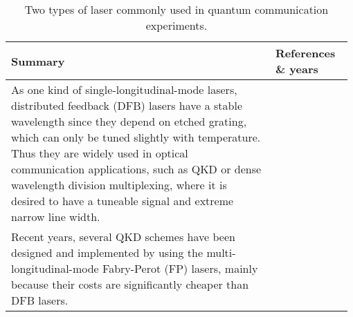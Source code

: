 \begin{table*}[!htbp]
	\begin{tabular}{|p{0.755\linewidth}|p{0.22\linewidth}|}
		\hline
		Summary & References \& years \\
		\hline \hline
		 As one kind of single-longitudinal-mode lasers, distributed feedback (DFB) lasers have a stable wavelength since they depend on etched grating, which can only be tuned slightly with temperature. Thus they are widely used in optical communication applications, such as QKD or dense wavelength division multiplexing, where it is desired to have a tuneable signal and extreme narrow line width. & \cite{bib:sun2016quantum, bib:liao2017long} \\
		\hline
		 Recent years, several QKD schemes have been designed and implemented by using the multi-longitudinal-mode Fabry-Perot (FP) lasers, mainly because their costs are significantly cheaper than DFB lasers. &  \cite{bib:choi2011quantum,  bib:wang2015experimental} \\
        \hline
	\end{tabular}
	\captionspacetab \caption{Two types of laser commonly used in quantum communication experiments.} \label{tab:coherent_states}
\end{table*}

